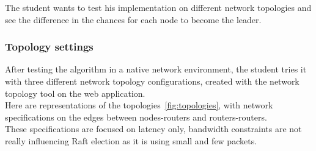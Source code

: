\documentclass{eplmastersthesis}
\begin{document}
        The student wants to test his implementation on different network
        topologies and see the difference in the chances for each node to
        become the leader.

        \subsubsection{Topology settings}

          After testing the algorithm in a native network environment,
          the student tries it with three different network
          topology configurations, created with the network topology tool on
          the web application.\\
          Here are representations of the topologies~\ref{fig:topologies},
          with network specifications on the edges between nodes-routers and
          routers-routers.\\
          These specifications are focused on latency only,
          bandwidth constraints are not really influencing Raft election as
          it is using small and few packets.
\end{document}

